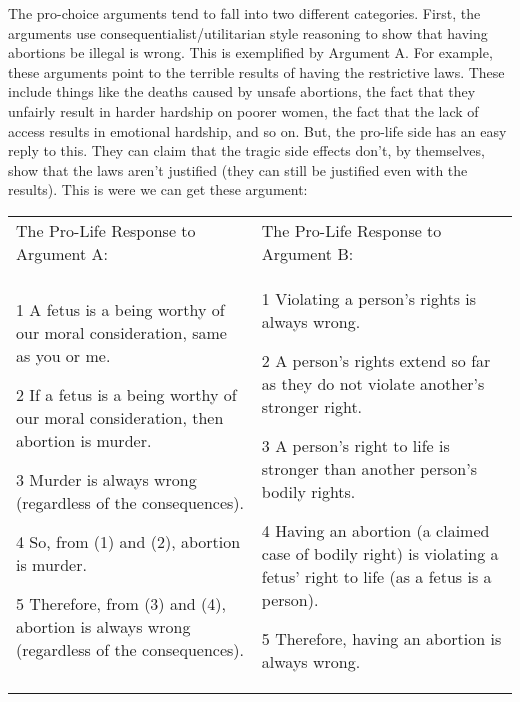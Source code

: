 The pro-choice arguments tend to fall into two different categories. First, the arguments use consequentialist/utilitarian style reasoning to show that having abortions be illegal is wrong. This is exemplified by Argument A. For example, these arguments point to the terrible results of having the restrictive laws. These include things like the deaths caused by unsafe abortions, the fact that they unfairly result in harder hardship on poorer women, the fact that the lack of access results in emotional hardship, and so on. But, the pro-life side has an easy reply to this. They can claim that the tragic side effects don't, by themselves, show that the laws aren't justified (they can still be justified even with the results). This is were we can get these argument: 
\noindent
\begin{tabular}{p{2.75in}|p{2.75in}}
The Pro-Life Response to Argument A:&The Pro-Life Response to Argument B:\\
\begin{earg}
    \item[1 ] A fetus is a being worthy of our moral consideration, same as you or me.
    \item[2 ] If a fetus is a being worthy of our moral consideration, then abortion is murder.
    \item[3 ] Murder is always wrong (regardless of the consequences).
    \item[4 ] So, from (1) and (2), abortion is murder.
    \item[5 ] Therefore, from (3) and (4), abortion is always wrong (regardless of the consequences). 
\end{earg}&
\begin{earg}
    \item[1 ] Violating a person's rights is always wrong.
    \item[2 ] A person's rights extend so far as they do not violate another's stronger right.
    \item[3 ] A person's right to life is stronger than another person's bodily rights.
    \item[4 ] Having an abortion (a claimed case of bodily right) is violating a fetus' right to life (as a fetus is a person).
    \item[5 ] Therefore, having an abortion is always wrong.
\end{earg}
\end{tabular}

